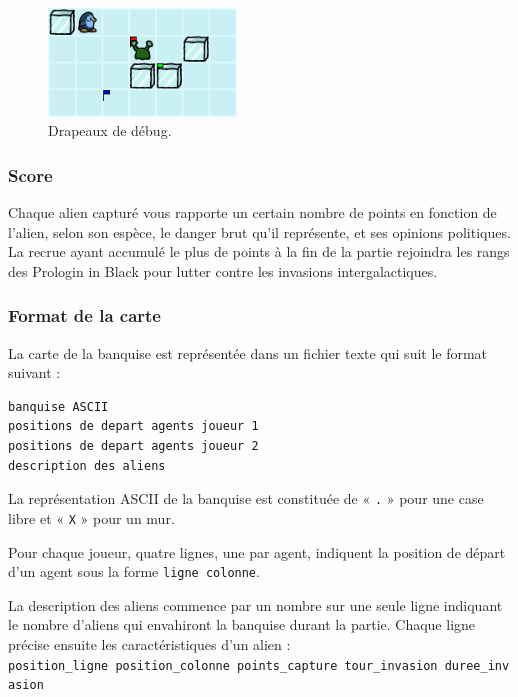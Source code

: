 \begin{figure}[!h]
    \centering
    \includegraphics[width=5cm]{img/debug_flags}
    \caption*{Drapeaux de débug.}
\end{figure}

\subsubsection{Score}\label{score}

Chaque alien capturé vous rapporte un certain nombre de points en
fonction de l'alien, selon son espèce, le danger brut qu'il représente,
et ses opinions politiques. La recrue ayant accumulé le plus de points à
la fin de la partie rejoindra les rangs des Prologin in Black pour
lutter contre les invasions intergalactiques.

\subsubsection{Format de la carte}\label{format-de-la-carte}

La carte de la banquise est représentée dans un fichier texte qui suit
le format suivant :

\begin{verbatim}
banquise ASCII
positions de depart agents joueur 1
positions de depart agents joueur 2
description des aliens
\end{verbatim}

La représentation ASCII de la banquise est constituée de « \texttt{.} » pour
une case libre et « \texttt{X} » pour un mur.

Pour chaque joueur, quatre lignes, une par agent, indiquent la position
de départ d'un agent sous la forme \texttt{ligne\ colonne}.

La description des aliens commence par un nombre sur une seule ligne
indiquant le nombre d'aliens qui envahiront la banquise durant la
partie. Chaque ligne précise ensuite les caractéristiques d'un alien :
\texttt{position\_ligne\ position\_colonne\ points\_capture\ tour\_invasion\ duree\_invasion}
